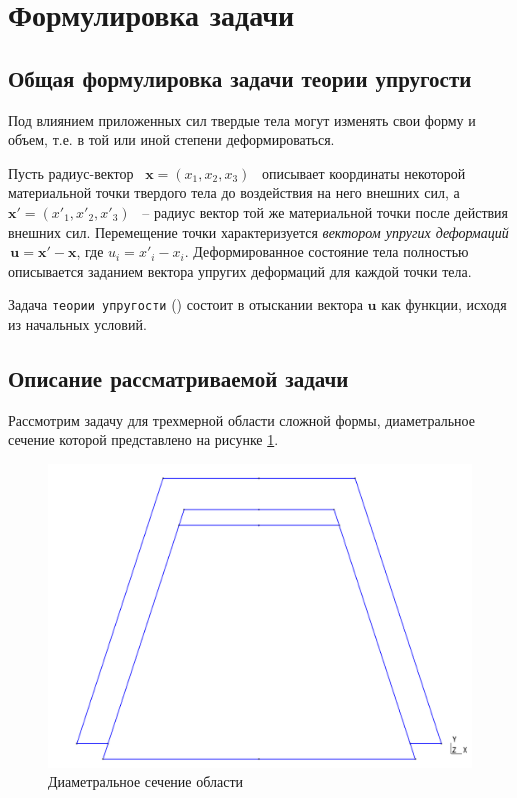 \documentclass[a4paper, 14pt]{extreport}
\begin{document}
\section{Формулировка задачи}
\subsection{Общая формулировка задачи теории упругости}


Под влиянием приложенных сил твердые тела могут изменять свои форму и объем, 
т.е. в той или иной степени деформироваться.

Пусть радиус-вектор \, $\textbf{x} = (x_1, x_2, x_3)$ \, описывает координаты 
некоторой материальной точки твердого тела до воздействия на него внешних сил,
а \, $\textbf{x}' = (x'_1, x'_2, x'_3)$ \, -- радиус вектор той же материальной
точки после действия внешних сил. Перемещение точки характеризуется 
\textit{вектором упругих деформаций} \,$\textbf{u} = \textbf{x}' - \textbf{x}$, 
где  $u_i = x'_i - x_i$. Деформированное состояние тела
полностью описывается заданием вектора упругих деформаций для каждой точки тела.

Задача \texttt{теории упругости} (\cite{math_elasticity_theory}) состоит в 
отыскании вектора $\textbf{u}$ как функции, исходя из начальных условий.

\subsection{Описание рассматриваемой задачи}

Рассмотрим задачу для трехмерной области сложной формы, диаметральное сечение
которой представлено на рисунке \ref{fig: domain}.
\begin{figure}[h]
	\center
	\includegraphics[scale=0.3]{pictures/1.png}
	\caption{Диаметральное сечение области}
	\label{fig: domain}
\end{figure}
\end{document}
